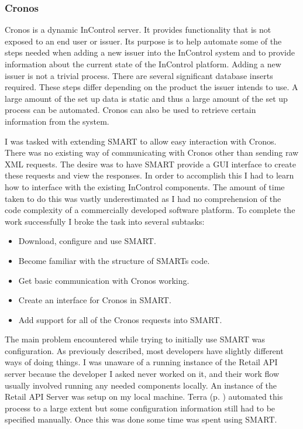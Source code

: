 \documentclass[a4paper, 11pt, titlepage]{article}
\begin{document}
 
\subsubsection{Cronos} 
Cronos is a dynamic InControl server. It provides functionality that is not exposed to an end user or issuer. Its purpose is to help automate some of the steps needed when adding a new issuer into the InControl system and to provide information about the current state of the InControl platform. Adding a new issuer is not a trivial process. There are several significant database inserts required. These steps differ depending on the product the issuer intends to use. A large amount of the set up data is static and thus a large amount of the set up process can be automated. Cronos can also be used to retrieve certain information from the system. 

I was tasked with extending SMART to allow easy interaction with Cronos. There was no existing way of communicating with Cronos other than sending raw XML requests. The desire was to have SMART provide a GUI interface to create these requests and view the responses. 
In order to accomplish this I had to learn how to interface with the existing InControl components. The amount of time taken to do this was vastly underestimated as I had no comprehension of the code complexity of a commercially developed software platform. To complete the work successfully I broke the task into several subtasks: \
\begin{itemize} 
\item Download, configure and use SMART.
\item Become familiar with the structure of SMARTs code. 
\item Get basic communication with Cronos working. 
\item Create an interface for Cronos in SMART. 
\item Add support for all of the Cronos requests into SMART. 
\end{itemize} 
The main problem encountered while trying to initially use SMART was configuration. As previously described, most developers have slightly different ways of doing things. I was unaware of a running instance of the Retail API server because the developer I asked never worked on it, and their work flow usually involved running any needed components locally. An instance of the Retail API Server was setup on my local machine. Terra (p. \pageref{Terra} ) automated this process to a large extent but some configuration information still had to be specified manually. Once this was done some time was spent using SMART.  
 
\end{document}
